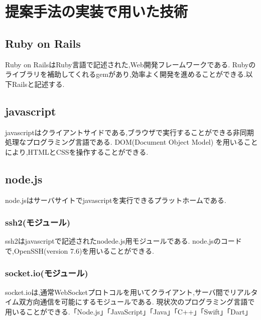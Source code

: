 \section{提案手法の実装で用いた技術}
    \subsection{Ruby on Rails\cite{Ruby on Rails}}
    Ruby on RailsはRuby言語で記述された,Web開発フレームワークである.
    Rubyのライブラリを補助してくれるgemがあり,効率よく開発を進めることができる.以下Railsと記述する.
    \subsection{javascript\cite{javascript}}
    javascriptはクライアントサイドである,ブラウザで実行することができる非同期処理なプログラミング言語である.
    DOM(Document Object Model) を用いることにより,HTMLとCSSを操作することができる.
    \subsection{node.js\cite{node.js}}
        node.jsはサーバサイトでjavascriptを実行できるプラットホームである.
        \subsubsection{ssh2(モジュール)\cite{ssh2-module}}%
            ssh2はjavascriptで記述されたnodede.js用モジュールである.
            node.jsのコードで,OpenSSH(version 7.6)を用いることができる.
        \subsubsection{socket.io(モジュール)\cite{socket.io}}%
            socket.ioは,通常WebSocketプロトコルを用いてクライアント,サーバ間でリアルタイム双方向通信を可能にするモジュールである.
            現状次のプログラミング言語で用いることができる.「Node.js」「JavaScript」「Java」「C++」「Swift」「Dart」 

